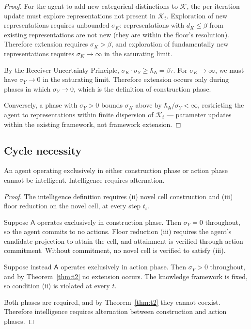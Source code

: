 \documentclass[11pt,twocolumn,a4paper]{article}
\newcommand{\K}{\mathcal{K}}
\newcommand{\agent}{\mathsf{A}}
\newcommand{\hbarA}{\hbar_{\agent}}
\begin{document}
\begin{proof}
For the agent to add new categorical distinctions to $\K$, the per-iteration update
must explore representations not present in $\K_t$. Exploration of new representations
requires unbounded $\sigma_K$: representations with $d_K \le \beta$ from existing
representations are not new (they are within the floor's resolution). Therefore
extension requires $\sigma_K > \beta$, and exploration of fundamentally new
representations requires $\sigma_K \to \infty$ in the saturating limit.

By the Receiver Uncertainty Principle, $\sigma_K \cdot \sigma_Y \ge \hbarA = \beta \tau$.
For $\sigma_K \to \infty$, we must have $\sigma_Y \to 0$ in the saturating limit.
Therefore extension occurs only during phases in which $\sigma_Y \to 0$, which is the
definition of construction phase.

Conversely, a phase with $\sigma_Y > 0$ bounds $\sigma_K$ above by $\hbarA / \sigma_Y < \infty$,
restricting the agent to representations within finite dispersion of $\K_t$ ---
parameter updates within the existing framework, not framework extension.
\end{proof}

\subsection{Cycle necessity}

\begin{theorem}\label{thm:t3}
An agent operating exclusively in either construction phase or action phase cannot be
intelligent. Intelligence requires alternation.
\end{theorem}

\begin{proof}
The intelligence definition requires (ii) novel cell construction and (iii) floor
reduction on the novel cell, at every step $t_i$.

Suppose $\agent$ operates exclusively in construction phase. Then $\sigma_Y = 0$
throughout, so the agent commits to no actions. Floor reduction (iii) requires the
agent's candidate-projection to attain the cell, and attainment is verified through
action commitment. Without commitment, no novel cell is verified to satisfy (iii).

Suppose instead $\agent$ operates exclusively in action phase. Then $\sigma_Y > 0$
throughout, and by Theorem~\ref{thm:t2} no extension occurs. The knowledge framework
is fixed, so condition (ii) is violated at every $t$.

Both phases are required, and by Theorem~\ref{thm:t2} they cannot coexist. Therefore
intelligence requires alternation between construction and action phases.
\end{proof}
\end{document}

